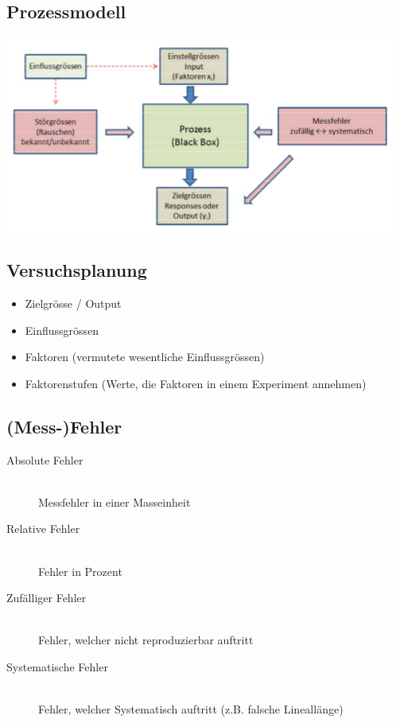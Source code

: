 \subsection{Prozessmodell}

	\includegraphics[scale=0.75]{img/prozessmodell.png}

\subsection{Versuchsplanung}

\begin{itemize}
	\item	Zielgrösse / Output
	\item	Einflussgrössen
	\item	Faktoren (vermutete wesentliche Einflussgrössen)
	\item	Faktorenstufen (Werte, die Faktoren in einem Experiment annehmen)
\end{itemize}

\subsection{(Mess-)Fehler}

\begin{description}
	\item[Absolute Fehler] \hfill \\
		Messfehler in einer Masseinheit
	\item[Relative Fehler] \hfill \\
		Fehler in Prozent
	\item[Zufälliger Fehler] \hfill \\
		Fehler, welcher nicht reproduzierbar auftritt
	\item[Systematische Fehler] \hfill \\
		Fehler, welcher Systematisch auftritt (z.B. falsche Lineallänge)
\end{description}

